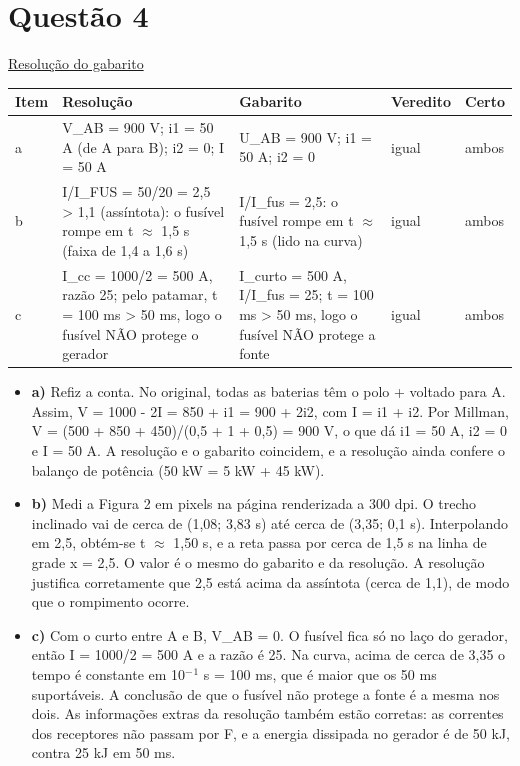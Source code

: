 \documentclass{article}%
\begin{document}
\section*{Questão 4}%
\href{https://poliedroresolve.sistemapoliedro.com.br/vestibulares/ime/2027/ime-2-fase-dia-2-27-10-2026-2-fase-dia-2/dissertativa-4-fisica-2-fase-dia-2-ime-2027}{Resolução do gabarito}\par\smallskip%
\begin{longtable}{@{}p{} p{} p{} p{} p{}@{}}\toprule Item & Resolução & Gabarito & Veredito & Certo \\ \midrule
a & V\_AB = 900 V; i1 = 50 A (de A para B); i2 = 0; I = 50 A & U\_AB = 900 V; i1 = 50 A; i2 = 0 & igual & ambos \\
b & I/I\_FUS = 50/20 = 2,5 > 1,1 (assíntota): o fusível rompe em t $\approx$ 1,5 s (faixa de 1,4 a 1,6 s) & I/I\_fus = 2,5: o fusível rompe em t $\approx$ 1,5 s (lido na curva) & igual & ambos \\
c & I\_cc = 1000/2 = 500 A, razão 25; pelo patamar, t = 100 ms > 50 ms, logo o fusível NÃO protege o gerador & I\_curto = 500 A, I/I\_fus = 25; t = 100 ms > 50 ms, logo o fusível NÃO protege a fonte & igual & ambos \\
\bottomrule\end{longtable}%
\begin{itemize}%
\item%
\textbf{a)} Refiz a conta. No original, todas as baterias têm o polo + voltado para A. Assim, V = 1000 - 2I = 850 + i1 = 900 + 2i2, com I = i1 + i2. Por Millman, V = (500 + 850 + 450)/(0,5 + 1 + 0,5) = 900 V, o que dá i1 = 50 A, i2 = 0 e I = 50 A. A resolução e o gabarito coincidem, e a resolução ainda confere o balanço de potência (50 kW = 5 kW + 45 kW).%
\item%
\textbf{b)} Medi a Figura 2 em pixels na página renderizada a 300 dpi. O trecho inclinado vai de cerca de (1,08; 3,83 s) até cerca de (3,35; 0,1 s). Interpolando em 2,5, obtém{-}se t $\approx$ 1,50 s, e a reta passa por cerca de 1,5 s na linha de grade x = 2,5. O valor é o mesmo do gabarito e da resolução. A resolução justifica corretamente que 2,5 está acima da assíntota (cerca de 1,1), de modo que o rompimento ocorre.%
\item%
\textbf{c)} Com o curto entre A e B, V\_AB = 0. O fusível fica só no laço do gerador, então I = 1000/2 = 500 A e a razão é 25. Na curva, acima de cerca de 3,35 o tempo é constante em 10$^{-}$$^{1}$ s = 100 ms, que é maior que os 50 ms suportáveis. A conclusão de que o fusível não protege a fonte é a mesma nos dois. As informações extras da resolução também estão corretas: as correntes dos receptores não passam por F, e a energia dissipada no gerador é de 50 kJ, contra 25 kJ em 50 ms.%
\end{itemize}%
\end{document}
